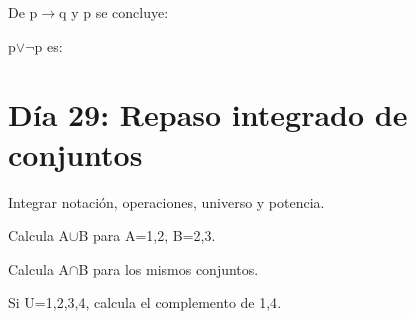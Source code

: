\begin{activity}[id=dia-28-opcion-01,type=choice,weight=1]

De p\(\to\)q y p se concluye:





\end{activity}

\begin{activity}[id=dia-28-opcion-02,type=choice,weight=1]

p\(\lor\)\(\neg\)p es:





\end{activity}

\section{Día 29: Repaso integrado de conjuntos}

\begin{lesson}[id=dia-29-lectura,weight=0]

Integrar notación, operaciones, universo y potencia.

\end{lesson}

\begin{activity}[id=dia-29-corta-01,type=short,weight=1]

Calcula A\(\cup\)B para A={1,2}, B={2,3}.

\end{activity}

\begin{activity}[id=dia-29-corta-02,type=short,weight=1]

Calcula A\(\cap\)B para los mismos conjuntos.

\end{activity}

\begin{activity}[id=dia-29-corta-03,type=short,weight=1]

Si U={1,2,3,4}, calcula el complemento de {1,4}.

\end{activity}

